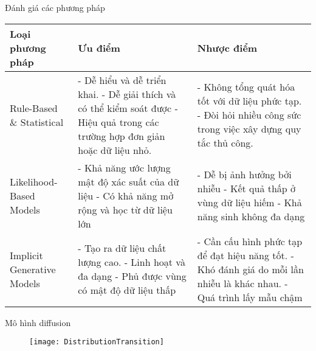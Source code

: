 \begin{frame}{Đánh giá các phương pháp}
	
	\begin{table}[h!]
		\footnotesize
		\centering
		\renewcommand{\arraystretch}{1.5} %
		\begin{tabular}{|p{}|p{}|p{}|}
			\hline
			\textbf{Loại phương pháp} & \textbf{Ưu điểm} & \textbf{Nhược điểm} \\ \hline
			Rule-Based \& Statistical & 
			- Dễ hiểu và dễ triển khai. \newline 
			- Dễ giải thích và có thể kiểm soát được \newline
			- Hiệu quả trong các trường hợp đơn giản hoặc dữ liệu nhỏ. & 
			- Không tổng quát hóa tốt với dữ liệu phức tạp. \newline 
			- Đòi hỏi nhiều công sức trong việc xây dựng quy tắc thủ công. \\ \hline
			Likelihood-Based Models & 
			- Khả năng ước lượng mật độ xác suất của dữ liệu \newline 
			- Có khả năng mở rộng và học từ dữ liệu lớn & 
			- Dễ bị ảnh hưởng bởi nhiễu \newline 
			- Kết quả thấp ở vùng dữ liệu hiếm \newline
			- Khả năng sinh không đa dạng \\ \hline
			Implicit Generative Models & 
			- Tạo ra dữ liệu chất lượng cao. \newline 
			- Linh hoạt và đa dạng \newline
			- Phủ được vùng có mật độ dữ liệu thấp & 
			- Cần cấu hình phức tạp để đạt hiệu năng tốt. \newline 
			- Khó đánh giá do mỗi lần nhiễu là khác nhau. \newline 
			- Quá trình lấy mẫu chậm \\ \hline
		\end{tabular}
	\end{table}
	
\end{frame}

\begin{frame}{Mô hình diffusion}
	\begin{figure}
		\texttt{[image: DistributionTransition]}
	\end{figure}	
\end{frame}

